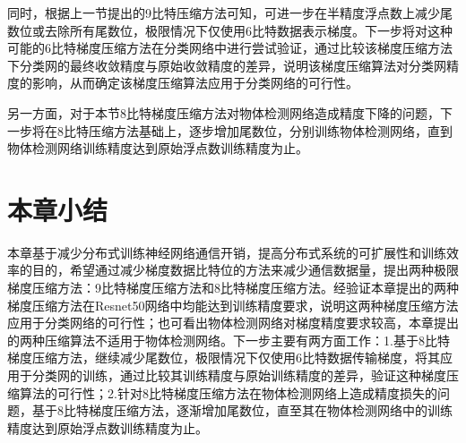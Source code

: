 同时，根据上一节提出的9比特压缩方法可知，可进一步在半精度浮点数上减少尾数位或去除所有尾数位，极限情况下仅使用6比特数据表示梯度。下一步将对这种可能的6比特梯度压缩方法在分类网络中进行尝试验证，通过比较该梯度压缩方法下分类网的最终收敛精度与原始收敛精度的差异，说明该梯度压缩算法对分类网精度的影响，从而确定该梯度压缩算法应用于分类网络的可行性。

另一方面，对于本节8比特梯度压缩方法对物体检测网络造成精度下降的问题，下一步将在8比特压缩方法基础上，逐步增加尾数位，分别训练物体检测网络，直到物体检测网络训练精度达到原始浮点数训练精度为止。


\section{本章小结}
本章基于减少分布式训练神经网络通信开销，提高分布式系统的可扩展性和训练效率的目的，希望通过减少梯度数据比特位的方法来减少通信数据量，提出两种极限梯度压缩方法：9比特梯度压缩方法和8比特梯度压缩方法。经验证本章提出的两种梯度压缩方法在Resnet50网络中均能达到训练精度要求，说明这两种梯度压缩方法应用于分类网络的可行性；也可看出物体检测网络对梯度精度要求较高，本章提出的两种压缩算法不适用于物体检测网络。下一步主要有两方面工作：1.基于8比特梯度压缩方法，继续减少尾数位，极限情况下仅使用6比特数据传输梯度，将其应用于分类网的训练，通过比较其训练精度与原始训练精度的差异，验证这种梯度压缩算法的可行性；2.针对8比特梯度压缩方法在物体检测网络上造成精度损失的问题，基于8比特梯度压缩方法，逐渐增加尾数位，直至其在物体检测网络中的训练精度达到原始浮点数训练精度为止。







